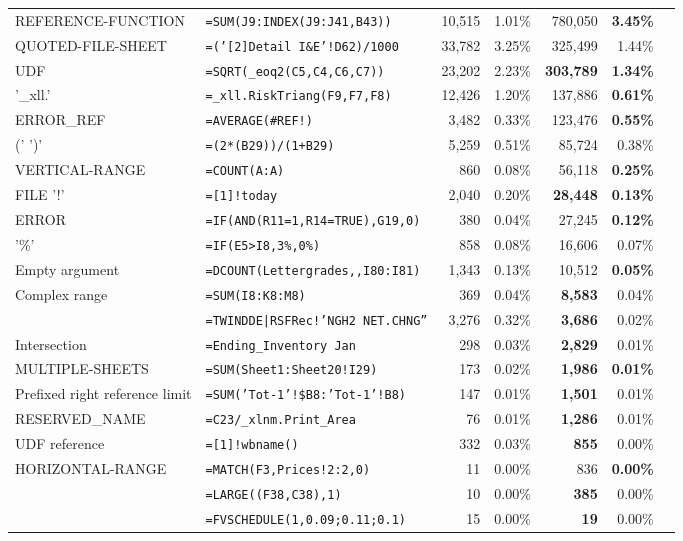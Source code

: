 \documentclass[conference]{IEEEtran}
\begin{document}
\begin{table*}
\begin{tabular}{llrrrrr}
		REFERENCE-FUNCTION & \texttt{=SUM(J9:INDEX(J9:J41,B43))}  & 10,515 & 1.01\% & 780,050 &\textbf{ 3.45\%}\\
		QUOTED-FILE-SHEET & \texttt{=('[2]Detail I\&E'!D62)/1000}  & 33,782 & 3.25\% & 325,499 & 1.44\%\\
		UDF & \texttt{=SQRT(_eoq2(C5,C4,C6,C7))}  & 23,202 & 2.23\% & \textbf{303,789} & \textbf{1.34\%}\\
		'_xll.' & \texttt{=_xll.RiskTriang(F9,F7,F8)}  & 12,426 & 1.20\% & 137,886 & \textbf{0.61\%}\\
		ERROR_REF & \texttt{=AVERAGE(\#REF!)}  & 3,482 & 0.33\% & 123,476 & \textbf{0.55\%}\\
		(' \synt{Reference} ')' & \texttt{=(2*(B29))/(1+B29)}  & 5,259 & 0.51\% & 85,724 & 0.38\%\\
		VERTICAL-RANGE & \texttt{=COUNT(A:A)}  & 860 & 0.08\% & 56,118 & \textbf{0.25\%}\\
		FILE '!' & \texttt{=[1]!today}  & 2,040 & 0.20\% & \textbf{28,448} &\textbf{0.13\%}\\
		ERROR & \texttt{=IF(AND(R11=1,R14=TRUE),G19,0)}  & 380 & 0.04\% & 27,245 & \textbf{0.12\%}\\
		'\%' & \texttt{=IF(E5>I8,3\%,0\%)}  & 858 & 0.08\% & 16,606 & 0.07\%\\
			Empty argument & \texttt{=DCOUNT(Lettergrades,,I80:I81)}  & 1,343 & 0.13\% & 10,512 & \textbf{0.05\%}\\
			Complex range & \texttt{=SUM(I8:K8:M8)}  & 369 & 0.04\% & \textbf{8,583} & 0.04\%\\
			\synt{DynamicDataExchange} & \texttt{=TWINDDE|RSFRec!'NGH2 NET.CHNG''}  & 3,276 & 0.32\% & \textbf{3,686} & 0.02\%\\
			Intersection & \texttt{=Ending_Inventory Jan}  & 298 & 0.03\% & \textbf{2,829} & 0.01\%\\
			MULTIPLE-SHEETS & \texttt{=SUM(Sheet1:Sheet20!I29)}  & 173 & 0.02\% &\textbf{1,986} &\textbf{ 0.01\%}\\
			Prefixed right reference limit & \texttt{=SUM('Tot-1'!\$B8:'Tot-1'!B8)}  & 147 & 0.01\% & \textbf{1,501} & 0.01\%\\
			RESERVED_NAME & \texttt{=C23/_xlnm.Print_Area}  & 76 & 0.01\% &\textbf{1,286} & 0.01\%\\
			UDF reference & \texttt{=[1]!wbname()}  & 332 & 0.03\% & \textbf{855} & 0.00\%\\
			HORIZONTAL-RANGE & \texttt{=MATCH(F3,Prices!2:2,0)}  & 11 & 0.00\% & 836 & \textbf{0.00\%}\\
			\synt{Union} & \texttt{=LARGE((F38,C38),1)}  & 10 & 0.00\% & \textbf{385} & 0.00\%\\
			\synt{ConstantArray} & \texttt{=FVSCHEDULE(1,{0.09;0.11;0.1})}  & 15 & 0.00\% & \textbf{19} & 0.00\%\\
			\hline
	\end{tabular}
\end{table*}
\end{document}
